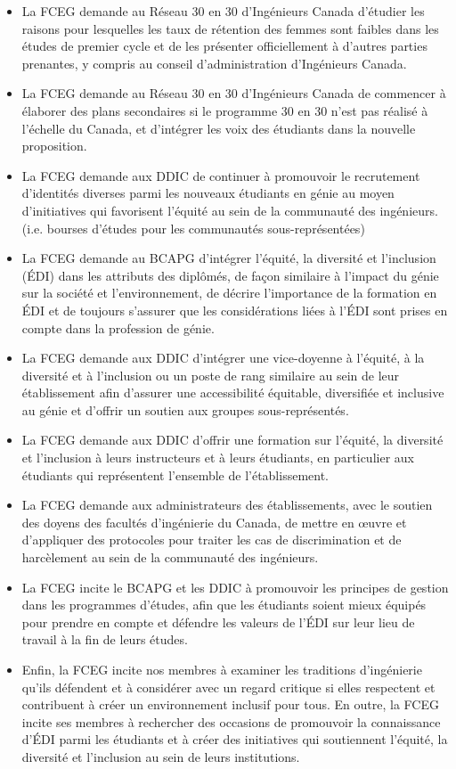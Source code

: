 \begin{itemize}
 \item La FCEG demande au Réseau 30 en 30 d'Ingénieurs Canada d'étudier les raisons pour lesquelles les taux de rétention des femmes sont faibles dans les études de premier cycle et de les présenter officiellement à d'autres parties prenantes, y compris au conseil d'administration d'Ingénieurs Canada.
 \item La FCEG demande au Réseau 30 en 30 d'Ingénieurs Canada de commencer à élaborer des plans secondaires si le programme 30 en 30 n'est pas réalisé à l'échelle du Canada, et d'intégrer les voix des étudiants dans la nouvelle proposition.
 \item La FCEG demande aux DDIC de continuer à promouvoir le recrutement d'identités diverses parmi les nouveaux étudiants en génie au moyen d'initiatives qui favorisent l'équité au sein de la communauté des ingénieurs. (i.e. bourses d'études pour les communautés sous-représentées)
 \item La FCEG demande au BCAPG d'intégrer l'équité, la diversité et l'inclusion (ÉDI) dans les attributs des diplômés, de façon similaire à l'impact du génie sur la société et l'environnement, de décrire l'importance de la formation en ÉDI et de toujours s'assurer que les considérations liées à l'ÉDI sont prises en compte dans la profession de génie.
 \item La FCEG demande aux DDIC d'intégrer une vice-doyenne à l'équité, à la diversité et à l'inclusion ou un poste de rang similaire au sein de leur établissement afin d'assurer une accessibilité équitable, diversifiée et inclusive au génie et d'offrir un soutien aux groupes sous-représentés.
 \item La FCEG demande aux DDIC d'offrir une formation sur l'équité, la diversité et l'inclusion à leurs instructeurs et à leurs étudiants, en particulier aux étudiants qui représentent l'ensemble de l'établissement.
 \item La FCEG demande aux administrateurs des établissements, avec le soutien des doyens des facultés d'ingénierie du Canada, de mettre en œuvre et d'appliquer des protocoles pour traiter les cas de discrimination et de harcèlement au sein de la communauté des ingénieurs.
 \item La FCEG incite le BCAPG et les DDIC à promouvoir les principes de gestion dans les programmes d'études, afin que les étudiants soient mieux équipés pour prendre en compte et défendre les valeurs de l'ÉDI sur leur lieu de travail à la fin de leurs études.
 \item Enfin, la FCEG incite nos membres à examiner les traditions d'ingénierie qu'ils défendent et à considérer avec un regard critique si elles respectent et contribuent à créer un environnement inclusif pour tous. En outre, la FCEG incite ses membres à rechercher des occasions de promouvoir la connaissance d'ÉDI parmi les étudiants et à créer des initiatives qui soutiennent l'équité, la diversité et l'inclusion au sein de leurs institutions.
\end{itemize}

